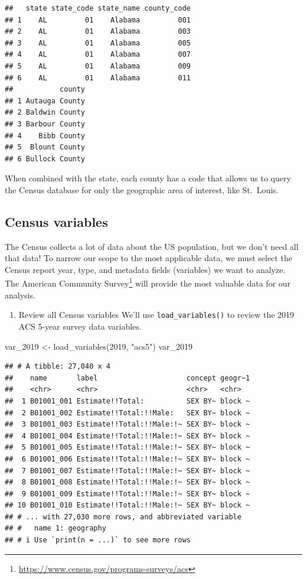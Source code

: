 \documentclass[
  krantz2]{krantz}
\makeatletter
\newenvironment{Shaded}{\begin{snugshade}}{\end{snugshade}}
\newcommand{\DecValTok}[1]{\textcolor[rgb]{0.06,0.06,0.06}{#1}}
\newcommand{\FunctionTok}[1]{\textcolor[rgb]{0,0,0}{#1}}
\newcommand{\NormalTok}[1]{#1}
\newcommand{\OtherTok}[1]{\textcolor[rgb]{0.37,0.37,0.37}{#1}}
\newcommand{\StringTok}[1]{\textcolor[rgb]{0.5,0.5,0.5}{#1}}
\providecommand{\tightlist}{%
  \setlength{\itemsep}{0pt}\setlength{\parskip}{0pt}}
\newenvironment{kframe}{%
\medskip{}
\setlength{\fboxsep}{.8em}
 \def\at@end@of@kframe{}%
 \ifinner\ifhmode%
  \def\at@end@of@kframe{\end{minipage}}%
  \begin{minipage}{\columnwidth}%
 \fi\fi%
 \def\FrameCommand##1{\hskip\@totalleftmargin \hskip-\fboxsep
 \colorbox{shadecolor}{##1}\hskip-\fboxsep
     \hskip-\linewidth \hskip-\@totalleftmargin \hskip\columnwidth}%
 \MakeFramed {\advance\hsize-\width
   \@totalleftmargin\z@ \linewidth\hsize
   \@setminipage}}%
 {\par\unskip\endMakeFramed%
 \at@end@of@kframe}
\renewenvironment{Shaded}{\begin{kframe}}{\end{kframe}}
\makeatother
\begin{document}
\begin{verbatim}
##   state state_code state_name county_code
## 1    AL         01    Alabama         001
## 2    AL         01    Alabama         003
## 3    AL         01    Alabama         005
## 4    AL         01    Alabama         007
## 5    AL         01    Alabama         009
## 6    AL         01    Alabama         011
##           county
## 1 Autauga County
## 2 Baldwin County
## 3 Barbour County
## 4    Bibb County
## 5  Blount County
## 6 Bullock County
\end{verbatim}

When combined with the state, each county has a code that allows us to query the Census database for only the geographic area of interest, like St.~Louis.

\hypertarget{census-variables}{%
\subsection{Census variables}\label{census-variables}}

The Census collects a lot of data about the US population, but we don't need all that data! To narrow our scope to the most applicable data, we must select the Census report year, type, and metadata fields (variables) we want to analyze. The American Community Survey\footnote{\url{https://www.census.gov/programs-surveys/acs}} will provide the most valuable data for our analysis.

\begin{enumerate}
\def\labelenumi{\arabic{enumi}.}
\tightlist
\item
  Review all Census variables
  We'll use \texttt{load\_variables()} to review the 2019 ACS 5-year survey data variables.
\end{enumerate}

\begin{Shaded}
\begin{Highlighting}[]
\NormalTok{var\_2019 }\OtherTok{\textless{}{-}} \FunctionTok{load\_variables}\NormalTok{(}\DecValTok{2019}\NormalTok{, }\StringTok{"acs5"}\NormalTok{)}
\NormalTok{var\_2019}
\end{Highlighting}
\end{Shaded}

\begin{verbatim}
## # A tibble: 27,040 x 4
##    name       label                     concept geogr~1
##    <chr>      <chr>                     <chr>   <chr>
##  1 B01001_001 Estimate!!Total:          SEX BY~ block ~
##  2 B01001_002 Estimate!!Total:!!Male:   SEX BY~ block ~
##  3 B01001_003 Estimate!!Total:!!Male:!~ SEX BY~ block ~
##  4 B01001_004 Estimate!!Total:!!Male:!~ SEX BY~ block ~
##  5 B01001_005 Estimate!!Total:!!Male:!~ SEX BY~ block ~
##  6 B01001_006 Estimate!!Total:!!Male:!~ SEX BY~ block ~
##  7 B01001_007 Estimate!!Total:!!Male:!~ SEX BY~ block ~
##  8 B01001_008 Estimate!!Total:!!Male:!~ SEX BY~ block ~
##  9 B01001_009 Estimate!!Total:!!Male:!~ SEX BY~ block ~
## 10 B01001_010 Estimate!!Total:!!Male:!~ SEX BY~ block ~
## # ... with 27,030 more rows, and abbreviated variable
## #   name 1: geography
## # i Use `print(n = ...)` to see more rows
\end{verbatim}
\end{document}
